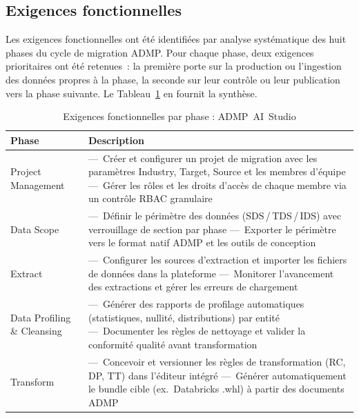 \subsection{Exigences fonctionnelles}
\label{subsec:ef}

Les exigences fonctionnelles ont été identifiées par analyse systématique des huit phases du cycle de migration ADMP. Pour chaque phase, deux exigences prioritaires ont été retenues~: la première porte sur la production ou l'ingestion des données propres à la phase, la seconde sur leur contrôle ou leur publication vers la phase suivante. Le Tableau~\ref{tab:ef} en fournit la synthèse.

\begin{table}[H]
\centering
\caption{Exigences fonctionnelles par phase : ADMP~AI~Studio}
\label{tab:ef}
\begin{tabularx}{\textwidth}{p{4cm}X}
\toprule
\textbf{Phase} & \textbf{Description} \\
\midrule
Project Management &
  ---~Créer et configurer un projet de migration avec les paramètres Industry, Target, Source et les membres d'équipe\newline
  ---~Gérer les rôles et les droits d'accès de chaque membre via un contrôle RBAC granulaire \\
\addlinespace
Data Scope &
  ---~Définir le périmètre des données (SDS\,/\,TDS\,/\,IDS) avec verrouillage de section par phase\newline
  ---~Exporter le périmètre vers le format natif ADMP et les outils de conception \\
\addlinespace
Extract &
  ---~Configurer les sources d'extraction et importer les fichiers de données dans la plateforme\newline
  ---~Monitorer l'avancement des extractions et gérer les erreurs de chargement \\
\addlinespace
Data Profiling \& Cleansing &
  ---~Générer des rapports de profilage automatiques (statistiques, nullité, distributions) par entité\newline
  ---~Documenter les règles de nettoyage et valider la conformité qualité avant transformation \\
\addlinespace
Transform &
  ---~Concevoir et versionner les règles de transformation (RC, DP, TT) dans l'éditeur intégré\newline
  ---~Générer automatiquement le bundle cible (ex.~Databricks .whl) à partir des documents ADMP \\

\end{tabularx}
\end{table}
